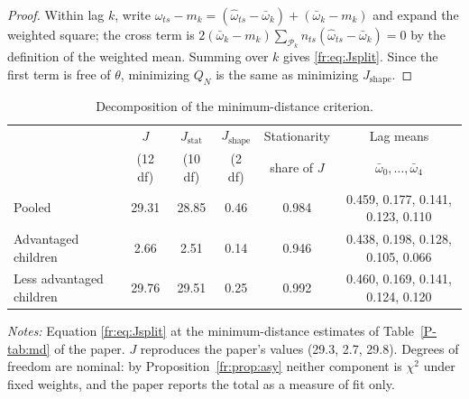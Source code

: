 \begin{proof}
Within lag $k$, write
$\hat\omega_{ts} - m_k = (\hat\omega_{ts} - \bar\omega_k) + (\bar\omega_k - m_k)$
and expand the weighted square; the cross term is
$2(\bar\omega_k - m_k)\sum_{\mathcal P_k}n_{ts}(\hat\omega_{ts} - \bar\omega_k) = 0$
by the definition of the weighted mean. Summing over $k$ gives
\eqref{fr:eq:Jsplit}. Since the first term is free of $\theta$, minimizing
$Q_N$ is the same as minimizing $J_{\mathrm{shape}}$.
\end{proof}

\begin{table}[!htb]
\centering
\small
\setlength{\tabcolsep}{4pt}
\caption{Decomposition of the minimum-distance criterion.}
\label{fr:tab:Jsplit}
\begin{tabular}{@{}lccccc@{}}
\toprule
& $J$ & $J_{\mathrm{stat}}$ & $J_{\mathrm{shape}}$ & Stationarity & Lag means \\
& (12 df) & (10 df) & (2 df) & share of $J$ & $\bar\omega_0,\ldots,\bar\omega_4$ \\
\midrule
Pooled & 29.31 & 28.85 & 0.46 & 0.984 & 0.459, 0.177, 0.141, 0.123, 0.110 \\
Advantaged children & 2.66 & 2.51 & 0.14 & 0.946 & 0.438, 0.198, 0.128, 0.105, 0.066 \\
Less advantaged children & 29.76 & 29.51 & 0.25 & 0.992 & 0.460, 0.169, 0.141, 0.124, 0.120 \\
\bottomrule
\end{tabular}
\par\smallskip
\begin{minipage}{0.95\textwidth}
\footnotesize\emph{Notes:} Equation \eqref{fr:eq:Jsplit} at the
minimum-distance estimates of Table~\ref{P-tab:md} of the paper. $J$
reproduces the paper's values (29.3, 2.7, 29.8). Degrees of freedom are
nominal: by Proposition~\ref{fr:prop:asy} neither component is $\chi^2$
under fixed weights, and the paper reports the total as a measure of fit only.
\end{minipage}
\end{table}

